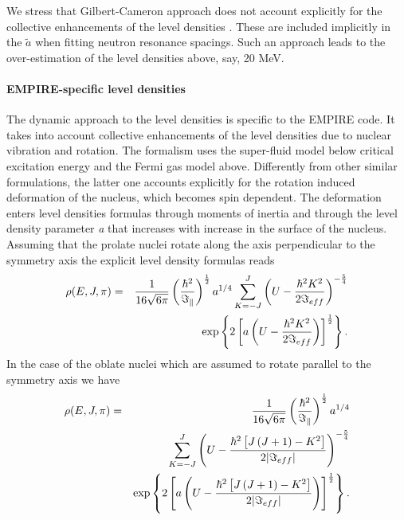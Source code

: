 We stress that Gilbert-Cameron approach does not account explicitly for the
collective enhancements of the level densities%
. These are included implicitly in the $%
\widetilde{a}$ when fitting neutron resonance spacings. Such an approach
leads to the over-estimation of the level densities above, say, 20 MeV.

\medskip

\paragraph{EMPIRE-specific level densities}

The dynamic approach to the level densities%
 is specific to the EMPIRE code. It takes into
account collective enhancements of the level densities due to nuclear
vibration and rotation. The formalism uses the super-fluid model below
critical excitation energy and the Fermi gas model above. Differently from
other similar formulations, the latter one accounts explicitly for the
rotation induced deformation of the nucleus, which becomes spin dependent.
The deformation enters level densities formulas through moments of inertia
and through the level density parameter \emph{a} that increases with
increase in the surface of the nucleus. Assuming that the prolate nuclei
rotate along the axis perpendicular to the symmetry axis the explicit level
density formulas reads
\begin{eqnarray}
\rho(E,J,\pi) & = &
\frac{1}{16\sqrt{6\pi}}\left(\frac{\hbar^{2}}{\Im_{\Vert}}\right)^{\frac{1}{2%
}}a^{1/4}\sum_{K=-J}^{J}\left(U-\frac{\hbar^{2}K^{2}}{2\Im_{eff}}\right)^{-%
\frac{5}{4}}  \notag \\
& & \exp\left\{ 2\left[a\left(U-\frac{\hbar^{2}K^{2}}{2\Im_{eff}}\right)%
\right]^{\frac{1}{2}}\right\} .  \label{ro1}
\end{eqnarray}
In the case of the oblate nuclei which are assumed to rotate parallel to the
symmetry axis we have
\begin{eqnarray}
\rho(E,J,\pi) & = & \frac{1}{16\sqrt{6\pi}}\left(\frac{\hbar^{2}}{\Im_{\Vert}%
}\right)^{\frac{1}{2}}a^{1/4}  \notag \\
& & \sum_{K=-J}^{J}\left(U-\frac{\hbar^{2}\left[J\left(J+1\right)-K^{2}%
\right]}{2|\Im_{eff}|}\right)^{-\frac{5}{4}}  \label{ro2} \\
& & \exp\left\{ 2\left[a\left(U-\frac{\hbar^{2}\left[J\left(J+1\right)-K^{2}%
\right]}{2|\Im_{eff}|}\right)\right]^{\frac{1}{2}}\right\} .  \notag
\end{eqnarray}
